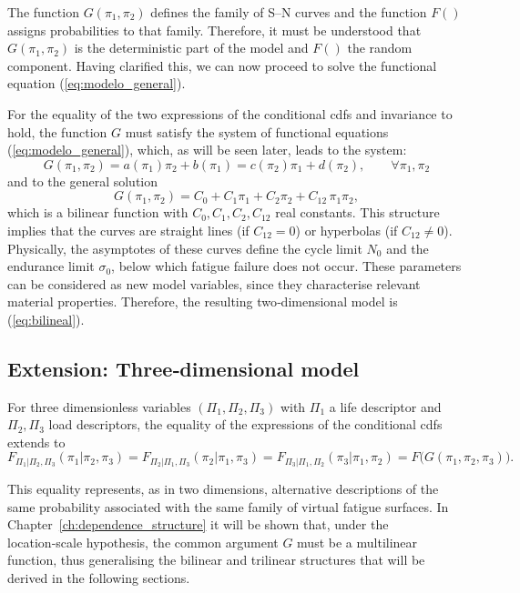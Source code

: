 The function $G(\pi_1,\pi_2)$ defines the family of S–N curves and the function $F()$ assigns probabilities to that family. Therefore, it must be understood that $G(\pi_1,\pi_2)$ is the deterministic part of the model and $F()$ the random component. Having clarified this, we can now proceed to solve the functional equation (\ref{eq:modelo_general}).

For the equality of the two expressions of the conditional cdfs and invariance to hold, the function $G$ must satisfy the system of functional equations (\ref{eq:modelo_general}), which, as will be seen later, leads to the system:
\begin{equation}
G(\pi_1,\pi_2) = a(\pi_1)\pi_2 + b(\pi_1) = c(\pi_2)\pi_1 + d(\pi_2), \qquad \forall \pi_1,\pi_2
\label{eq:funcional}
\end{equation}
and to the general solution
\begin{equation}
G(\pi_1,\pi_2) = C_0 + C_1\pi_1 + C_2\pi_2 + C_{12}\,\pi_1\pi_2,
\label{eq:bilineal}
\end{equation}
which is a bilinear function with $C_0,C_1,C_2,C_{12}$ real constants. This structure implies that the curves are straight lines (if $C_{12}=0$) or hyperbolas (if $C_{12}\neq0$). Physically, the asymptotes of these curves define the cycle limit $N_0$ and the endurance limit $\sigma_0$, below which fatigue failure does not occur. These parameters can be considered as new model variables, since they characterise relevant material properties. Therefore, the resulting two‑dimensional model is (\ref{eq:bilineal}).

\subsection{Extension: Three‑dimensional model}

For three dimensionless variables $(\Pi_1,\Pi_2,\Pi_3)$ with $\Pi_1$ a life descriptor and $\Pi_2,\Pi_3$ load descriptors, the equality of the expressions of the conditional cdfs extends to
\begin{equation}
F_{\Pi_1|\Pi_2,\Pi_3}(\pi_1|\pi_2,\pi_3)
=
F_{\Pi_2|\Pi_1,\Pi_3}(\pi_2|\pi_1,\pi_3)
=
F_{\Pi_3|\Pi_1,\Pi_2}(\pi_3|\pi_1,\pi_2)
=
F\bigl(G(\pi_1,\pi_2,\pi_3)\bigr).
\label{eq:equalcdfs3D}
\end{equation}

This equality represents, as in two dimensions, alternative descriptions of the same probability associated with the same family of virtual fatigue surfaces. In Chapter~\ref{ch:dependence_structure} it will be shown that, under the location‑scale hypothesis, the common argument $G$ must be a multilinear function, thus generalising the bilinear and trilinear structures that will be derived in the following sections.

